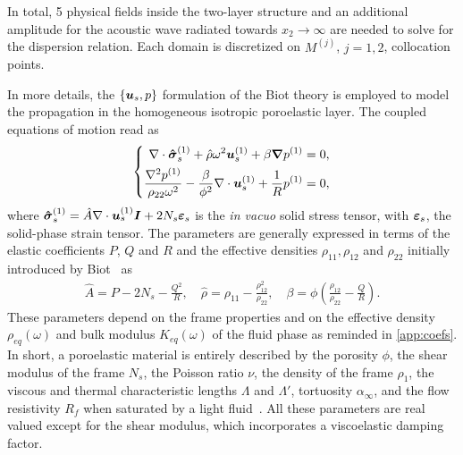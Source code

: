
In total, 5 physical fields inside the two-layer structure and an additional amplitude for the acoustic wave radiated towards $x_2 \rightarrow \infty $ are needed to solve for the dispersion relation. Each domain is discretized on $M^{(j)}$, $j=1,2$, collocation points.

In more details, the $\{\boldsymbol u_s, p\}$ formulation of the Biot theory \cite{atalla1998} is employed to model the propagation in the homogeneous isotropic poroelastic layer. The coupled equations of motion read as
    \begin{equation}
        \left\{
        \begin{aligned}
            \nabla \cdot \boldsymbol{\hat{\sigma}}_s^{(1)} + \hat \rho \omega^2 \boldsymbol u_s^{(1)} +  \beta \boldsymbol \nabla p^{(1)} &= 0, \\
            \frac{\nabla^2 p^{(1)}}{\rho_{22} \omega^2} - \frac{\beta}{\phi^2} \nabla \cdot \boldsymbol u_s^{(1)} + \frac{1}{ R}p^{(1)} &= 0,
        \end{aligned}
        \right.
        \label{eq:up_motion_equations}
    \end{equation}
    where $\boldsymbol{\hat{\sigma}}_s^{(1)} = \hat A \nabla \cdot \boldsymbol u_s^{(1)} \boldsymbol I + 2 N_s \boldsymbol \varepsilon_s$ is the \emph{in vacuo} solid stress tensor, with $\boldsymbol \varepsilon_s$, the solid-phase strain tensor. The parameters are generally expressed in terms of the elastic coefficients $ P$,  $Q$ and $ R$ and the effective densities $\rho_{11}, \rho_{12}$ and $ \rho_{22}$ initially introduced by Biot~\cite{biot1956,allard2009} as
    \begin{equation}
        \begin{split}
             \hat A = P-2N_s - \frac{ Q^2}{ R}, \quad \hat \rho = \rho_{11} - \frac{ \rho_{12}^2}{ \rho_{22}},
            \quad \beta = \phi \left( \frac{ \rho_{12}}{ \rho_{22}} - \frac{ Q}{ R} \right).
        \end{split}\label{eq:biot_coefs}
    \end{equation}
These parameters depend on the frame properties and on the effective density ${\rho}_{eq}(\omega)$ and bulk modulus ${K}_{eq}(\omega)$ of the fluid phase as reminded in \ref{app:coefs}. In short, a poroelastic material is entirely described by the porosity $\phi$, the shear modulus of the frame $N_s$, the Poisson ratio $\nu$, the density of the frame $\rho_1$, the viscous and thermal characteristic lengths $\Lambda$ and $\Lambda'$, tortuosity $\alpha_\infty$, and the flow resistivity $R_f$ when saturated by a light fluid~\cite{biot1956,johnson1987,champoux1991}. All these parameters are real valued except for the shear modulus, which incorporates a viscoelastic damping factor.
    
